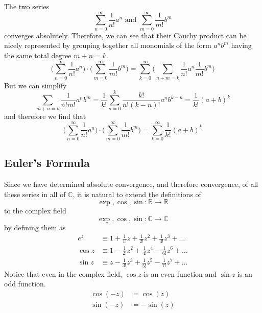 \documentclass{article}
\begin{document}
    \begin{example}
    The two series 
    \[\sum_{n = 0}^\infty \frac{1}{n!} a^n \text{ and } \sum_{m = 0}^\infty \frac{1}{m!} b^m\]
    converges absolutely. Therefore, we can see that their Cauchy product can be nicely represented by grouping together all monomials of the form $a^n b^m$ having the same total degree $m + n = k$. 
    \[\bigg( \sum_{n = 0}^\infty \frac{1}{n!} a^n \bigg) \cdot \bigg( \sum_{m = 0}^\infty \frac{1}{m!} b^m \bigg) = \sum_{k=0}^\infty \bigg(\sum_{n+m=k} \frac{1}{n!} a^n \frac{1}{m!} b^m \bigg)\]
    But we can simplify 
    \[\sum_{m + n = k} \frac{1}{n! m!} a^n b^m = \frac{1}{k!} \sum_{n=0}^k \frac{k!}{n! (k-n)!} a^n b^{k-n} = \frac{1}{k!} (a + b)^k\]
    and therefore we find that 
    \[\bigg( \sum_{n = 0}^\infty \frac{1}{n!} a^n \bigg) \cdot \bigg( \sum_{m = 0}^\infty \frac{1}{m!} b^m \bigg) = \sum_{k=0}^\infty \frac{1}{k!} (a + b)^k\]
  \end{example}

    \subsection{Euler's Formula}

    \begin{definition}
      Since we have determined absolute convergence, and therefore convergence, of all these series in all of $\mathbb{C}$, it is natural to extend the definitions of 
      \[\exp, \cos, \sin: \mathbb{R} \longrightarrow \mathbb{R}\]
      to the complex field 
      \[\exp, \cos, \sin: \mathbb{C} \longrightarrow \mathbb{C}\]
      by defining them as 
      \begin{align*}
          e^z & \equiv 1 + \frac{1}{1!}z + \frac{1}{2!} z^2 + \frac{1}{3!} z^3 + \ldots \\
          \cos{z} & \equiv 1 - \frac{1}{2!} z^2 + \frac{1}{4!} z^4 - \frac{1}{6!} z^6 + \ldots \\
          \sin{z} & \equiv z - \frac{1}{3!} z^3 + \frac{1}{5!} z^5 - \frac{1}{7!} z^7 + \ldots
      \end{align*}
      Notice that even in the complex field, $\cos{z}$ is an even function and $\sin{z}$ is an odd function. 
      \begin{align*}
          \cos(-z) & = \cos(z) \\
          \sin(-z) & = -\sin(z)
      \end{align*}
    \end{definition}
\end{document}

